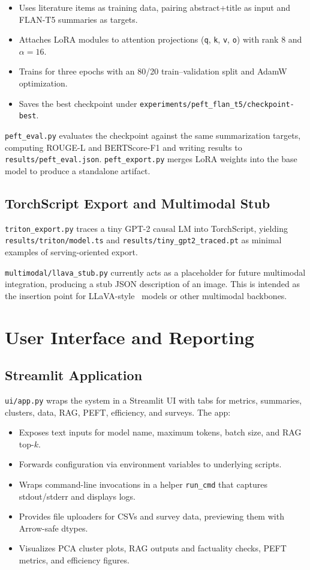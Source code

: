 \documentclass[11pt]{article}
\begin{document}
\begin{itemize}[leftmargin=1.5em]
\item Uses literature items as training data, pairing abstract+title as input and FLAN-T5 summaries as targets.
\item Attaches LoRA modules to attention projections (\verb|q|, \verb|k|, \verb|v|, \verb|o|) with rank 8 and $\alpha=16$.
\item Trains for three epochs with an 80/20 train--validation split and AdamW optimization.
\item Saves the best checkpoint under \verb|experiments/peft_flan_t5/checkpoint-best|.
\end{itemize}

\verb|peft_eval.py| evaluates the checkpoint against the same summarization targets, computing ROUGE-L and BERTScore-F1 and writing results to \verb|results/peft_eval.json|. \verb|peft_export.py| merges LoRA weights into the base model to produce a standalone artifact.

\subsection{TorchScript Export and Multimodal Stub}

\verb|triton_export.py| traces a tiny GPT-2 causal LM into TorchScript, yielding \verb|results/triton/model.ts| and \verb|results/tiny_gpt2_traced.pt| as minimal examples of serving-oriented export.

\verb|multimodal/llava_stub.py| currently acts as a placeholder for future multimodal integration, producing a stub JSON description of an image. This is intended as the insertion point for LLaVA-style~\citep{liu2023llava} models or other multimodal backbones.

\section{User Interface and Reporting}

\subsection{Streamlit Application}

\verb|ui/app.py| wraps the system in a Streamlit UI with tabs for metrics, summaries, clusters, data, RAG, PEFT, efficiency, and surveys. The app:

\begin{itemize}[leftmargin=1.5em]
\item Exposes text inputs for model name, maximum tokens, batch size, and RAG top-$k$.
\item Forwards configuration via environment variables to underlying scripts.
\item Wraps command-line invocations in a helper \verb|run_cmd| that captures stdout/stderr and displays logs.
\item Provides file uploaders for CSVs and survey data, previewing them with Arrow-safe dtypes.
\item Visualizes PCA cluster plots, RAG outputs and factuality checks, PEFT metrics, and efficiency figures.
\end{itemize}
\end{document}
